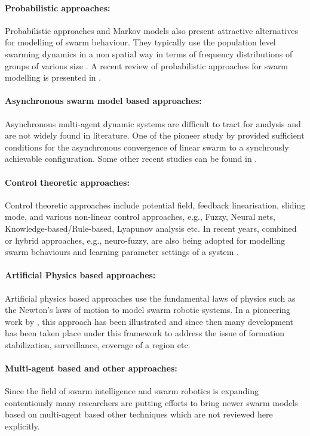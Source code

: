 \paragraph*{Probabilistic approaches:}
Probabilistic approaches and Markov models also present attractive alternatives for modelling of swarm behaviour. They typically use the population level swarming dynamics in a non spatial way in terms of frequency distributions of groups of various size \cite{Gazi+2006}. A recent review of probabilistic approaches for swarm modelling is presented in \cite{Lerman+2005}.
\paragraph*{Asynchronous swarm model based approaches:}
Asynchronous multi-agent dynamic systems are difficult to tract for analysis and are not widely found in literature. One of the pioneer study by \cite{Beni+1996} provided sufficient conditions for the asynchronous convergence of linear swarm to a synchrously achievable configuration. Some other recent studies can be found in \cite{Gazi+2006}.
\paragraph*{Control theoretic approaches:}
Control theoretic approaches include potential field, feedback linearisation, sliding mode, and various non-linear control approaches, e.g., Fuzzy, Neural nets, Knowledge-based/Rule-based, Lyapunov analysis etc. In recent years, combined or hybrid approaches, e.g., neuro-fuzzy, are also being adopted for modelling swarm behaviours and learning parameter settings of a system \cite{Sahin+2007}. 
\paragraph*{Artificial Physics based approaches:}
Artificial physics based approaches use the fundamental laws of physics such as the Newton's laws of motion to model swarm robotic systems. In a pioneering work by \cite{Spears+1999}, this approach has been illustrated and since then many development has been taken place under this framework to address the issue of formation stabilization, surveillance, coverage of a region etc.
\paragraph*{Multi-agent based and other approaches:}
Since the field of swarm intelligence and swarm robotics is expanding contentiously many researchers are putting efforts to bring newer swarm models based on multi-agent based other techniques which are not reviewed here explicitly.

